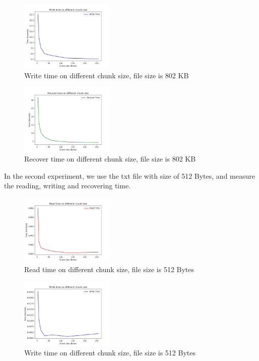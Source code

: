 \documentclass[journal]{IEEEtran}
\begin{document}
\begin{figure}[htbp]
	\centering
	\captionsetup{justification=centering}
	\includegraphics[width=0.4\textwidth]{fig/result_write.png}
	\caption{Write time on different chunk size, file size is 802 KB}
\end{figure}

\begin{figure}[]
	\centering
	\captionsetup{justification=centering}
	\includegraphics[width=0.4\textwidth]{fig/result_recover.png}
	\caption{Recover time on different chunk size, file size is 802 KB}
\end{figure}

In the second experiment, we use the txt file with size of 512 Bytes, and measure the reading, writing and recovering time.

\begin{figure}[H]
	\centering
	\captionsetup{justification=centering}
	\includegraphics[width=0.4\textwidth]{fig/result_read_small.png}
	\caption{Read time on different chunk size, file size is 512 Bytes}
\end{figure}

\begin{figure}[H]
	\centering
	\captionsetup{justification=centering}
	\includegraphics[width=0.4\textwidth]{fig/result_write_small.png}
	\caption{Write time on different chunk size, file size is 512 Bytes}
\end{figure}
\end{document}
